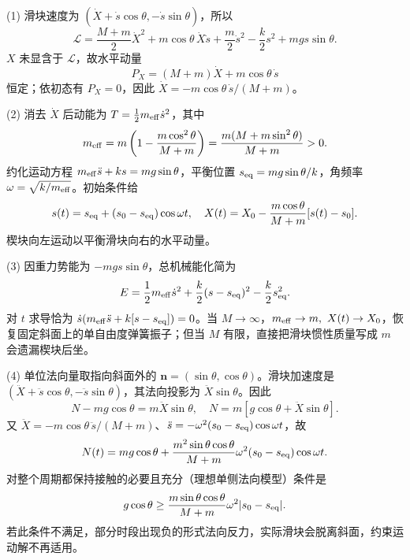 (1) 滑块速度为 \((\dot X+\dot s\cos\theta,-\dot s\sin\theta)\)，所以
\[
\mathcal L=\frac{M+m}{2}\dot X^2+m\cos\theta\,\dot X\dot s+\frac m2\dot s^2
-\frac k2s^2+mg s\sin\theta .
\]
\(X\) 未显含于 \(\mathcal L\)，故水平动量
\[
P_X=(M+m)\dot X+m\cos\theta\,\dot s
\]
恒定；依初态有 \(P_X=0\)，因此 \(\dot X=-m\cos\theta\,\dot s/(M+m)\)。

(2) 消去 \(\dot X\) 后动能为 \(T=\frac12m_{\rm eff}\dot s^2\)，其中
\[
m_{\rm eff}=m\left(1-\frac{m\cos^2\theta}{M+m}\right)
=\frac{m(M+m\sin^2\theta)}{M+m}>0.
\]
约化运动方程 \(m_{\rm eff}\ddot s+ks=mg\sin\theta\)，平衡位置 \(s_{\rm eq}=mg\sin\theta/k\)，角频率 \(\omega=\sqrt{k/m_{\rm eff}}\)。初始条件给
\[
s(t)=s_{\rm eq}+(s_0-s_{\rm eq})\cos\omega t,\quad
X(t)=X_0-\frac{m\cos\theta}{M+m}[s(t)-s_0].
\]
楔块向左运动以平衡滑块向右的水平动量。

(3) 因重力势能为 \(-mg s\sin\theta\)，总机械能化简为
\[
E=\frac12m_{\rm eff}\dot s^2+\frac k2(s-s_{\rm eq})^2-\frac k2s_{\rm eq}^2.
\]
对 \(t\) 求导恰为 \(\dot s(m_{\rm eff}\ddot s+k[s-s_{\rm eq}])=0\)。当 \(M\to\infty\)，\(m_{\rm eff}\to m,\ X(t)\to X_0\)，恢复固定斜面上的单自由度弹簧振子；但当 \(M\) 有限，直接把滑块惯性质量写成 \(m\) 会遗漏楔块后坐。

(4) 单位法向量取指向斜面外的 \(\boldsymbol n=(\sin\theta,\cos\theta)\)。滑块加速度是 \((\ddot X+\ddot s\cos\theta,-\ddot s\sin\theta)\)，其法向投影为 \(\ddot X\sin\theta\)。因此
\[
N-mg\cos\theta=m\ddot X\sin\theta,\quad
N=m[g\cos\theta+\ddot X\sin\theta].
\]
又 \(\ddot X=-m\cos\theta\,\ddot s/(M+m)\)、\(\ddot s=-\omega^2(s_0-s_{\rm eq})\cos\omega t\)，故
\[
N(t)=mg\cos\theta+
\frac{m^2\sin\theta\cos\theta}{M+m}\omega^2(s_0-s_{\rm eq})\cos\omega t.
\]
对整个周期都保持接触的必要且充分（理想单侧法向模型）条件是
\[
g\cos\theta\ge\frac{m\sin\theta\cos\theta}{M+m}\omega^2|s_0-s_{\rm eq}|.
\]
若此条件不满足，部分时段出现负的形式法向反力，实际滑块会脱离斜面，约束运动解不再适用。
